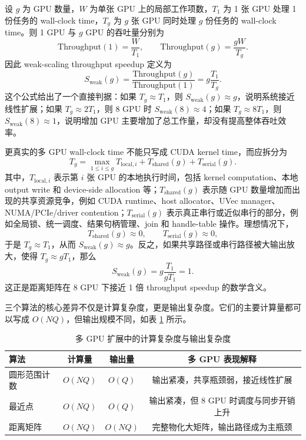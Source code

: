 设 \(g\) 为 GPU 数量，\(W\) 为单张 GPU 上的局部工作项数，\(T_1\) 为 1 张 GPU 处理 1 份任务的 wall-clock time，\(T_g\) 为 \(g\) 张 GPU 同时处理 \(g\) 份任务的 wall-clock time。则 1 GPU 与 \(g\) GPU 的吞吐量分别为
\[
  \mathrm{Throughput}(1)=\frac{W}{T_1},
  \qquad
  \mathrm{Throughput}(g)=\frac{gW}{T_g}.
\]
因此 weak-scaling throughput speedup 定义为
\[
  S_{\mathrm{weak}}(g)
  =
  \frac{\mathrm{Throughput}(g)}{\mathrm{Throughput}(1)}
  =
  g\frac{T_1}{T_g}.
\]
这个公式给出了一个直接判据：如果 \(T_g \approx T_1\)，则 \(S_{\mathrm{weak}}(g)\approx g\)，说明系统接近线性扩展；如果 \(T_g\approx 2T_1\)，则 8 GPU 时 \(S_{\mathrm{weak}}(8)\approx 4\)；如果 \(T_g\approx 8T_1\)，则 \(S_{\mathrm{weak}}(8)\approx 1\)，说明增加 GPU 主要增加了总工作量，却没有提高整体吞吐效率。

更真实的多 GPU wall-clock time 不能只写成 CUDA kernel time，而应拆分为
\[
  T_g
  =
  \max_{1\le i\le g} T_{\mathrm{local},i}
  +
  T_{\mathrm{shared}}(g)
  +
  T_{\mathrm{serial}}(g).
\]
其中，\(T_{\mathrm{local},i}\) 表示第 \(i\) 张 GPU 的本地执行时间，包括 kernel computation、本地 output write 和 device-side allocation 等；\(T_{\mathrm{shared}}(g)\) 表示随 GPU 数量增加而出现的共享资源竞争，例如 CUDA runtime、host allocator、UVec manager、NUMA/PCIe/driver contention；\(T_{\mathrm{serial}}(g)\) 表示真正串行或近似串行的部分，例如全局锁、统一调度、结果句柄管理、join 和 handle-table 操作。理想情况下，
\[
  T_{\mathrm{shared}}(g)\approx 0,
  \qquad
  T_{\mathrm{serial}}(g)\approx 0,
\]
于是 \(T_g\approx T_1\)，从而 \(S_{\mathrm{weak}}(g)\approx g\)。反之，如果共享路径或串行路径被大输出放大，使得 \(T_g\approx gT_1\)，那么
\[
  S_{\mathrm{weak}}(g)
  =
  g\frac{T_1}{gT_1}
  =
  1.
\]
这正是距离矩阵在 8 GPU 下接近 1 倍 throughput speedup 的数学含义。

三个算法的核心差异不仅是计算复杂度，更是输出复杂度。它们的主要计算量都可以写成 \(O(NQ)\)，但输出规模不同，如表 \ref{tab:multi-gpu-output-model} 所示。

\begin{table}[H]
\centering
\caption{多 GPU 扩展中的计算复杂度与输出复杂度}
\label{tab:multi-gpu-output-model}
\begin{tabular}{lccc}
\toprule
算法 & 计算量 & 输出量 & 多 GPU 表现解释 \\
\midrule
圆形范围计数 & \(O(NQ)\) & \(O(Q)\) & 输出紧凑，共享瓶颈弱，接近线性扩展 \\
最近点 & \(O(NQ)\) & \(O(Q)\) & 输出紧凑，但 8 GPU 时调度与同步开销上升 \\
距离矩阵 & \(O(NQ)\) & \(O(NQ)\) & 完整物化大矩阵，输出路径成为主瓶颈 \\
\bottomrule
\end{tabular}
\end{table}

